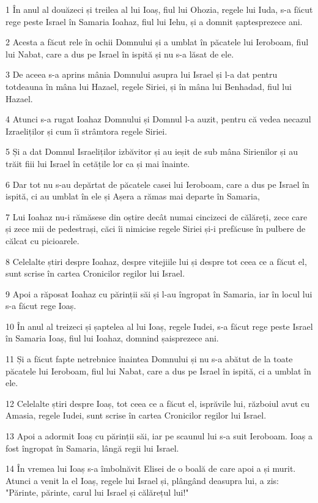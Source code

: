 \par 1 În anul al douăzeci și treilea al lui Ioaș, fiul lui Ohozia, regele lui Iuda, s-a făcut rege peste Israel în Samaria Ioahaz, fiul lui Iehu, și a domnit șaptesprezece ani.
\par 2 Acesta a făcut rele în ochii Domnului și a umblat în păcatele lui Ieroboam, fiul lui Nabat, care a dus pe Israel în ispită și nu s-a lăsat de ele.
\par 3 De aceea s-a aprins mânia Domnului asupra lui Israel și l-a dat pentru totdeauna în mâna lui Hazael, regele Siriei, și în mâna lui Benhadad, fiul lui Hazael.
\par 4 Atunci s-a rugat Ioahaz Domnului și Domnul l-a auzit, pentru că vedea necazul Izraeliților și cum îi strâmtora regele Siriei.
\par 5 Și a dat Domnul Israeliților izbăvitor și au ieșit de sub mâna Sirienilor și au trăit fiii lui Israel în cetățile lor ca și mai înainte.
\par 6 Dar tot nu s-au depărtat de păcatele casei lui Ieroboam, care a dus pe Israel în ispită, ci au umblat în ele și Așera a rămas mai departe în Samaria,
\par 7 Lui Ioahaz nu-i rămăsese din oștire decât numai cincizeci de călăreți, zece care și zece mii de pedestrași, căci îi nimicise regele Siriei și-i prefăcuse în pulbere de călcat cu picioarele.
\par 8 Celelalte știri despre Ioahaz, despre vitejiile lui și despre tot ceea ce a făcut el, sunt scrise în cartea Cronicilor regilor lui Israel.
\par 9 Apoi a răposat Ioahaz cu părinții săi și l-au îngropat în Samaria, iar în locul lui s-a făcut rege Ioaș.
\par 10 În anul al treizeci și șaptelea al lui Ioaș, regele Iudei, s-a făcut rege peste Israel în Samaria Ioaș, fiul lui Ioahaz, domnind șaisprezece ani.
\par 11 Și a făcut fapte netrebnice înaintea Domnului și nu s-a abătut de la toate păcatele lui Ieroboam, fiul lui Nabat, care a dus pe Israel în ispită, ci a umblat în ele.
\par 12 Celelalte știri despre Ioaș, tot ceea ce a făcut el, isprăvile lui, războiul avut cu Amasia, regele Iudei, sunt scrise în cartea Cronicilor regilor lui Israel.
\par 13 Apoi a adormit Ioaș cu părinții săi, iar pe scaunul lui s-a suit Ieroboam. Ioaș a fost îngropat în Samaria, lângă regii lui Israel.
\par 14 În vremea lui Ioaș s-a îmbolnăvit Elisei de o boală de care apoi a și murit. Atunci a venit la el Ioaș, regele lui Israel și, plângând deasupra lui, a zis: "Părinte, părinte, carul lui Israel și călărețul lui!"

